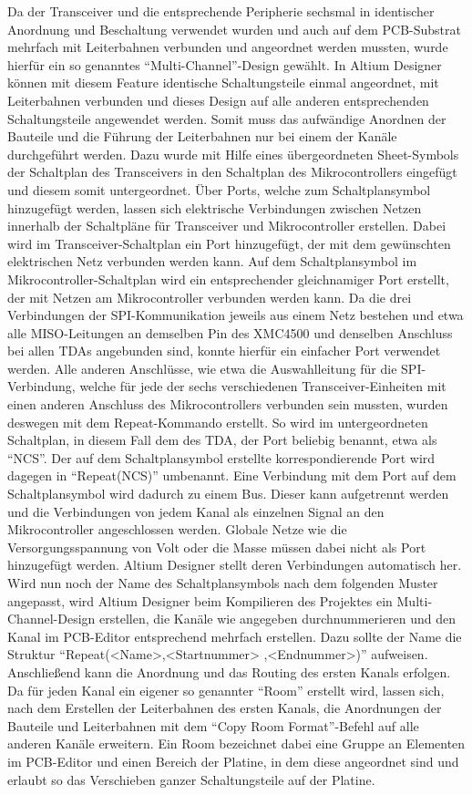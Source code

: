 Da der Transceiver und die entsprechende Peripherie sechsmal in identischer Anordnung und Beschaltung verwendet wurden und auch auf dem \ac{PCB}-Substrat mehrfach mit Leiterbahnen verbunden und angeordnet werden mussten, wurde hierfür ein so genanntes \enquote{Multi-Channel}-Design gewählt. In Altium Designer können mit diesem Feature identische Schaltungsteile einmal angeordnet, mit Leiterbahnen verbunden  und dieses Design auf alle anderen entsprechenden Schaltungsteile angewendet werden. Somit muss das aufwändige Anordnen der Bauteile und die Führung der Leiterbahnen nur bei einem der Kanäle durchgeführt werden.  Dazu wurde mit Hilfe eines übergeordneten Sheet-Symbols der Schaltplan des Transceivers in den Schaltplan des Mikrocontrollers eingefügt und diesem somit untergeordnet. Über Ports, welche zum  Schaltplansymbol hinzugefügt werden, lassen sich elektrische Verbindungen zwischen Netzen innerhalb der Schaltpläne für Transceiver  und Mikrocontroller erstellen. Dabei wird im Transceiver-Schaltplan ein Port hinzugefügt, der mit dem gewünschten elektrischen Netz  verbunden werden kann. Auf dem Schaltplansymbol im Mikrocontroller-Schaltplan wird ein entsprechender gleichnamiger Port erstellt, der mit Netzen am Mikrocontroller verbunden werden kann. Da die drei Verbindungen der \ac{SPI}-Kommunikation jeweils aus einem Netz bestehen und etwa alle \acs{MISO}-Leitungen an demselben Pin des XMC4500 und denselben Anschluss bei allen TDAs angebunden sind, konnte hierfür ein einfacher Port verwendet werden. Alle anderen Anschlüsse, wie etwa die Auswahlleitung für die \ac{SPI}-Verbindung, welche für jede der sechs verschiedenen Transceiver-Einheiten mit einen anderen Anschluss des Mikrocontrollers verbunden sein mussten, wurden deswegen mit dem Repeat-Kommando erstellt. So wird im untergeordneten Schaltplan, in diesem Fall dem des TDA, der Port beliebig benannt, etwa als \enquote{NCS}. Der auf dem Schaltplansymbol erstellte korrespondierende Port wird dagegen in \enquote{Repeat(NCS)} umbenannt. Eine Verbindung mit dem Port auf dem Schaltplansymbol wird dadurch zu einem Bus. Dieser kann aufgetrennt werden und die Verbindungen von jedem Kanal als einzelnen Signal an den Mikrocontroller angeschlossen werden. Globale Netze wie die Versorgungsspannung von \unit[3,3]{Volt} oder die Masse müssen dabei nicht als Port hinzugefügt werden. Altium Designer stellt deren Verbindungen automatisch her. Wird nun noch der Name des Schaltplansymbols nach dem folgenden Muster angepasst, wird Altium Designer beim Kompilieren des Projektes ein Multi-Channel-Design erstellen, die Kanäle wie angegeben durchnummerieren und den Kanal im \ac{PCB}-Editor entsprechend mehrfach erstellen. Dazu sollte der Name die Struktur \enquote{Repeat(<Name>,<Startnummer> ,<Endnummer>)} aufweisen. Anschließend kann die Anordnung und das Routing des ersten Kanals erfolgen. Da für jeden Kanal ein eigener so genannter \enquote{Room} erstellt wird, lassen sich, nach dem Erstellen der Leiterbahnen des ersten Kanals, die Anordnungen der Bauteile und Leiterbahnen mit dem \enquote{Copy Room Format}-Befehl auf alle anderen Kanäle erweitern. Ein Room bezeichnet dabei eine Gruppe an Elementen im PCB-Editor und einen Bereich der Platine, in dem diese angeordnet sind und erlaubt so das Verschieben ganzer Schaltungsteile auf der Platine. 